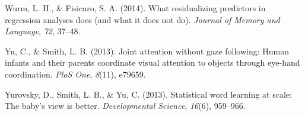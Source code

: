 \documentclass[10pt, letterpaper]{article}
\newenvironment{CSLReferences}%
  {}%
  {\par}
\begin{document}
\begin{CSLReferences}{1}{0}
\leavevmode\hypertarget{ref-wurm2014residualizing}{}%
Wurm, L. H., \& Fisicaro, S. A. (2014). What residualizing predictors in
regression analyses does (and what it does not do). \emph{Journal of
Memory and Language}, \emph{72}, 37--48.

\leavevmode\hypertarget{ref-yu2013joint}{}%
Yu, C., \& Smith, L. B. (2013). Joint attention without gaze following:
Human infants and their parents coordinate visual attention to objects
through eye-hand coordination. \emph{PloS One}, \emph{8}(11), e79659.

\leavevmode\hypertarget{ref-yurovsky2013statistical}{}%
Yurovsky, D., Smith, L. B., \& Yu, C. (2013). Statistical word learning
at scale: The baby's view is better. \emph{Developmental Science},
\emph{16}(6), 959--966.

\end{CSLReferences}


\end{document}
